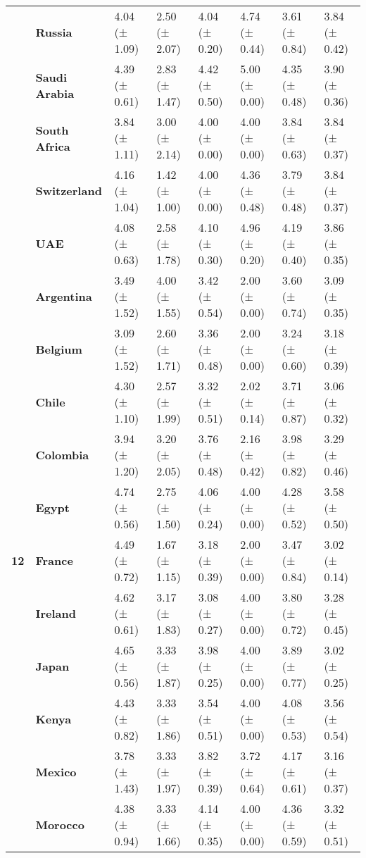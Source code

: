 \begin{longtable}{llllllll}
\textbf{} & \textbf{Russia} & 4.04 (± 1.09) & 2.50 (± 2.07) & 4.04 (± 0.20) & 4.74 (± 0.44) & 3.61 (± 0.84) & 3.84 (± 0.42) \\
\textbf{} & \textbf{Saudi Arabia} & 4.39 (± 0.61) & 2.83 (± 1.47) & 4.42 (± 0.50) & 5.00 (± 0.00) & 4.35 (± 0.48) & 3.90 (± 0.36) \\
\textbf{} & \textbf{South Africa} & 3.84 (± 1.11) & 3.00 (± 2.14) & 4.00 (± 0.00) & 4.00 (± 0.00) & 3.84 (± 0.63) & 3.84 (± 0.37) \\
\textbf{} & \textbf{Switzerland} & 4.16 (± 1.04) & 1.42 (± 1.00) & 4.00 (± 0.00) & 4.36 (± 0.48) & 3.79 (± 0.48) & 3.84 (± 0.37) \\
\textbf{} & \textbf{UAE} & 4.08 (± 0.63) & 2.58 (± 1.78) & 4.10 (± 0.30) & 4.96 (± 0.20) & 4.19 (± 0.40) & 3.86 (± 0.35) \\
\cline{1-8}
\multirow[t]{19}{*}{\textbf{12}} & \textbf{Argentina} & 3.49 (± 1.52) & 4.00 (± 1.55) & 3.42 (± 0.54) & 2.00 (± 0.00) & 3.60 (± 0.74) & 3.09 (± 0.35) \\
\textbf{} & \textbf{Belgium} & 3.09 (± 1.52) & 2.60 (± 1.71) & 3.36 (± 0.48) & 2.00 (± 0.00) & 3.24 (± 0.60) & 3.18 (± 0.39) \\
\textbf{} & \textbf{Chile} & 4.30 (± 1.10) & 2.57 (± 1.99) & 3.32 (± 0.51) & 2.02 (± 0.14) & 3.71 (± 0.87) & 3.06 (± 0.32) \\
\textbf{} & \textbf{Colombia} & 3.94 (± 1.20) & 3.20 (± 2.05) & 3.76 (± 0.48) & 2.16 (± 0.42) & 3.98 (± 0.82) & 3.29 (± 0.46) \\
\textbf{} & \textbf{Egypt} & 4.74 (± 0.56) & 2.75 (± 1.50) & 4.06 (± 0.24) & 4.00 (± 0.00) & 4.28 (± 0.52) & 3.58 (± 0.50) \\
\textbf{} & \textbf{France} & 4.49 (± 0.72) & 1.67 (± 1.15) & 3.18 (± 0.39) & 2.00 (± 0.00) & 3.47 (± 0.84) & 3.02 (± 0.14) \\
\textbf{} & \textbf{Ireland} & 4.62 (± 0.61) & 3.17 (± 1.83) & 3.08 (± 0.27) & 4.00 (± 0.00) & 3.80 (± 0.72) & 3.28 (± 0.45) \\
\textbf{} & \textbf{Japan} & 4.65 (± 0.56) & 3.33 (± 1.87) & 3.98 (± 0.25) & 4.00 (± 0.00) & 3.89 (± 0.77) & 3.02 (± 0.25) \\
\textbf{} & \textbf{Kenya} & 4.43 (± 0.82) & 3.33 (± 1.86) & 3.54 (± 0.51) & 4.00 (± 0.00) & 4.08 (± 0.53) & 3.56 (± 0.54) \\
\textbf{} & \textbf{Mexico} & 3.78 (± 1.43) & 3.33 (± 1.97) & 3.82 (± 0.39) & 3.72 (± 0.64) & 4.17 (± 0.61) & 3.16 (± 0.37) \\
\textbf{} & \textbf{Morocco} & 4.38 (± 0.94) & 3.33 (± 1.66) & 4.14 (± 0.35) & 4.00 (± 0.00) & 4.36 (± 0.59) & 3.32 (± 0.51) \\

\end{longtable}
